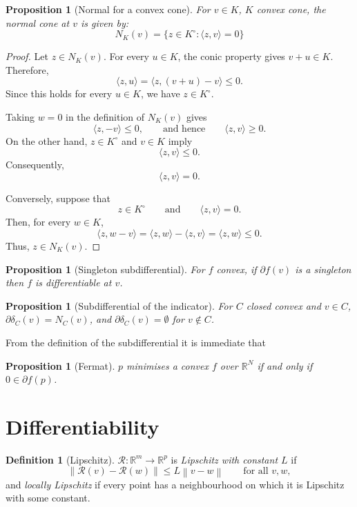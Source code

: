 \documentclass[a4paper,11pt]{book}
\theoremstyle{plain}
\newtheorem{proposition}[theorem]{Proposition}
\theoremstyle{definition}
\newtheorem{definition}[theorem]{Definition}
\theoremstyle{remark}
\numberwithin{equation}{chapter}
\numberwithin{algorithm}{chapter}
\newcommand{\R}{\mathbb{R}}
\newcommand{\norm}[1]{\left\|#1\right\|}
\begin{document}
	\begin{proposition}[Normal for a convex cone]
		For $v\in K$, $K$ convex cone, the normal cone at $v$ is given by:
		\begin{equation}
			N_K(v) = \{z \in K^{\circ} : \langle z,v \rangle = 0\}
		\end{equation}
	\end{proposition}
	\begin{proof}
		Let $z\in N_K(v)$. For every $u\in K$, the conic property gives $v+u\in K$.
		Therefore,
		\[
		\langle z,u\rangle
		=
		\langle z,(v+u)-v\rangle
		\leq0.
		\]
		Since this holds for every $u\in K$, we have $z\in K^\circ$.
		
		Taking $w=0$ in the definition of $N_K(v)$ gives
		\[
		\langle z,-v\rangle\leq0,
		\qquad\text{and hence}\qquad
		\langle z,v\rangle\geq0.
		\]
		On the other hand, $z\in K^\circ$ and $v\in K$ imply
		\[
		\langle z,v\rangle\leq0.
		\]
		Consequently,
		\[
		\langle z,v\rangle=0.
		\]
		
		Conversely, suppose that
		\[
		z\in K^\circ
		\qquad\text{and}\qquad
		\langle z,v\rangle=0.
		\]
		Then, for every $w\in K$,
		\[
		\langle z,w-v\rangle
		=
		\langle z,w\rangle-\langle z,v\rangle
		=
		\langle z,w\rangle
		\leq0.
		\]
		Thus, $z\in N_K(v)$.
	\end{proof}
	\begin{proposition}[Singleton subdifferential]
		For $f$ convex, if $\partial f(v)$ is a singleton then $f$ is differentiable
		at $v$.
	\end{proposition}
	
	\begin{proposition}[Subdifferential of the indicator]
		For $C$ closed convex and $v\in C$, $\partial\delta_C(v)=N_C(v)$, and
		$\partial\delta_C(v)=\emptyset$ for $v\notin C$. 
		
	\end{proposition}
	
	From the definition of the subdifferential it is immediate that
	\begin{proposition}[Fermat]
		$p$ minimises a convex $f$ over $\R^N$ if and only if $0\in\partial f(p)$.
	\end{proposition}
	
	\section{Differentiability}
	
	
	\begin{definition}[Lipschitz]
		$\mathcal{R}:\R^m\to\R^p$ is \emph{Lipschitz with constant $L$} if
		\begin{equation}
			\norm{\mathcal{R}(v)-\mathcal{R}(w)}\leq L\norm{v-w}
			\qquad\text{for all }v,w ,
		\end{equation}
		and \emph{locally Lipschitz} if every point has a neighbourhood on which it
		is Lipschitz with some constant.
	\end{definition}
	
\end{document}
